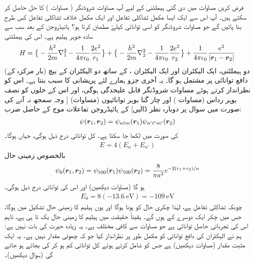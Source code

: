 فرض کریں مساوات  میں دی گئی ہیملٹنی کے لیے آپ مساوات شروڈنگر ( مساوات ) کا 
حل  حاصل کر سکتے ہیں۔ آپ اس سے ایک ایسا مکمل تشاکلی تفاعل اور ایک مکمل خلاف تشاکلی تفاعل کس طرح بنا پائیں گے جو مساوات شروڈنگر کو اسی توانائی کیلۓ مطمئن کرتا ہو؟
ہائیڈروجن کے بعد سب سے سادہ جوہر ہیلیم  ہے۔ اس کی ہیملٹنی
\begin{align}\label{مساوات_متماثل_ہیلیم_ہیملٹنی}
H= \big\{ -\frac{h^2}{2m}\nabla^2 _{1} -\frac{1}{4\pi\epsilon_{0}} \frac{2e^2}{r_{1}}\big\} +
 \big\{ -\frac{h^2}{2m} \nabla^2 _{2}-\frac{1}{4 \pi \epsilon_{0}} \frac{2e^2}{r_{2}}\big\}+ \frac{1}{4 \pi \epsilon_{0}}\frac{e^2}{|{{\boldsymbol{r}}}_{1} -{{\boldsymbol{r}}}_{2}|}
\end{align}
(بار  مرکزہ کے) دو  ہیملٹنی، ایک الیکٹران اور ایک الیکٹران ، کے ساتھ دو الیکٹران کے بیچ دافع توانائی پر مشتمل ہو گا۔ یہ آخری جزو ہمارے لئے پریشانی کا سبب بنتا ہے۔ اس کو نظرانداز کرتے ہوئے مساوات شروڈنگر قابل علیحدگی ہوگی، اور اس کے حلوں کو نصف بوہر رداس (مساوات ) اور چار گنا بوہر توانائیوں (مساوات) [ وجہ سمجھ نہ آنے کی صورت میں سوال  پر دوبارہ نظر ڈالیں] کے ہائیڈروجن تفاعلات موج کے حاصل ضرب:
\begin{align}
 \psi({{\boldsymbol{r}}}_{1}, {{\boldsymbol{r}}}_{2})= \psi_{n\ell m} ({{\boldsymbol{r}}}_{1}) \psi_{n'\ell' m'} ({{\boldsymbol{r}}}_{2})
\end{align}
کی صورت میں لکھا جا سکتا ہے۔ کل توانائی درج ذیل ہوگی، جہاں  ہوگا۔
\begin{align}
 E= 4(E_{n} +E_{n'})
 \end{align}
بالخصوص زمینی حال 
\begin{align}\label{مساوات_متماثل_ہیلیم_زمینی_حال}
\psi_{0}({{\boldsymbol{r}}}_{1}, {{\boldsymbol{r}}}_{2})=\psi_{100}({{\boldsymbol{r}}}_{1}) \psi_{100}({{\boldsymbol{r}}}_{2})=\frac{8}{\pi a^3}e^{-2(r_{1} + r_{2})/a}
\end{align}
ہو گا (مساوات  دیکھیں) اور اس کی توانائی درج ذیل ہوگی۔
\begin{align}\label{مساوات_متماثل_ہیلیم_توانائی_الف}
 E_{0}=8(\SI{-13.6}{\electronvolt})=\SI{-109}{\electronvolt}
 \end{align}
چونکہ  تشاکلی تفاعل ہے، لہٰذا چکری حال کو  ہونا ہوگا اور یوں ہیلیم کا زمینی حال  تشکیل میں ہوگا، جس میں چکر ایک دوسرے کے  ہوں گے۔ یقیناً حقیقت میں ہیلیم کا زمینی حال یک تا ہی ہے، تاہم اس کی تجرباتی حاصل توانائی  ہے جو مساوات  سے کافی مختلف ہے۔ یہ زیادہ حیرت کی بات نہیں ہے: ہم نے الیکٹران کی دافع توانائی کو مکمل طور پر نظرانداز کیا جو کہ چھوٹی مقدار نہیں ہے۔ یہ ایک مثبت مقدار (مساوات  دیکھیں) ہے جس کو شامل کرتے ہوئے کل توانائی کم ہو کر  کی بجائے  ہو جائے گی (سوال  دیکھیں)۔

